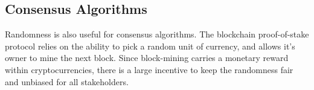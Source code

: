 \subsection{Consensus Algorithms}\label{subsec:usecase_consensus_algorithms}
Randomness is also useful for consensus algorithms. The blockchain proof-of-stake protocol relies on the ability to pick a random unit of currency, and allows it's owner to mine the next block. Since block-mining carries a monetary reward within cryptocurrencies, there is a large incentive to keep the randomness fair and unbiased for all stakeholders. 
